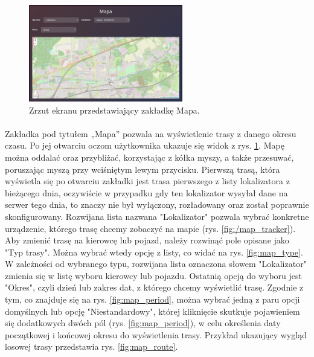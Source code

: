 \begin{figure}
	\centering
	\includegraphics[width=0.6\textwidth]{./graf/map_tab.png}
	\caption{Zrzut ekranu przedstawiający zakładkę Mapa.}
	\label{fig:map_tab}
\end{figure}

\paragraph{}
Zakładka pod tytułem „Mapa” pozwala na wyświetlenie trasy z danego okresu czasu. Po jej otwarciu oczom użytkownika ukazuje się widok z rys. \ref{fig:map_tab}. Mapę można oddalać oraz przybliżać, korzystając z kółka myszy, a także przesuwać, poruszając myszą przy wciśniętym lewym przycisku. Pierwszą trasą, która wyświetla się po otwarciu zakładki jest trasa pierwszego z listy lokalizatora z bieżącego dnia, oczywiście w przypadku gdy ten lokalizator wysyłał dane na serwer tego dnia, to znaczy nie był wyłączony, rozładowany oraz został poprawnie skonfigurowany. Rozwijana lista nazwana "Lokalizator" pozwala wybrać konkretne urządzenie, którego trasę chcemy zobaczyć na mapie (rys. \ref{fig:/map_tracker}). Aby zmienić trasę na kierowcę lub pojazd, należy rozwinąć pole opisane jako "Typ trasy". Można wybrać wtedy opcję z listy, co widać na rys. \ref{fig:map_type}. W zależności od wybranego typu, rozwijana lista oznaczona słowem "Lokalizator" zmienia się w listę wyboru kierowcy lub pojazdu. Ostatnią opcją do wyboru jest "Okres", czyli dzień lub zakres dat, z którego chcemy wyświetlić trasę. Zgodnie z tym, co znajduje się na rys. \ref{fig:map_period}, można wybrać jedną z paru opcji domyślnych lub opcję "Niestandardowy", której kliknięcie skutkuje pojawieniem się dodatkowych dwóch pól (rys. \ref{fig:map_period}), w celu określenia daty początkowej i końcowej okresu do wyświetlenia trasy. Przykład ukazujący wygląd losowej trasy przedstawia rys. \ref{fig:map_route}.

